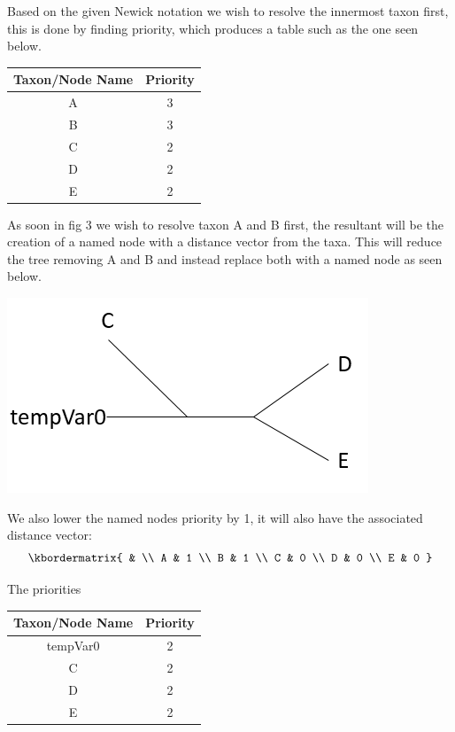 \documentclass{article}
\begin{document}
Based on the given Newick notation we wish to resolve the innermost taxon first, this is done by finding priority, which produces a table such as the one seen below.

\begin{center}
	\begin{tabular}{ |c|c| } 
		\hline
		Taxon/Node Name & Priority  \\
		\hline
		 A & 3 \\ 
		 \hline
		 B & 3 \\ 
		 \hline
		 C & 2 \\
		 \hline 
		 D & 2 \\
		 \hline 
		 E & 2 \\ 
		\hline
	\end{tabular}
\end{center}

As soon in fig 3 we wish to resolve taxon A and B first, the resultant will be the creation of a named node with a distance vector from the taxa. This will reduce the tree removing A and B and instead replace both with a named node as seen below. \newline

\includegraphics{secondTree.PNG} 

We also lower the named nodes priority by 1, it will also have the associated distance vector:
\[
\kbordermatrix{
	& \\
	A & 1 \\
	B & 1 \\
	C & 0 \\
	D & 0 \\
	E & 0
}
\]

The priorities 
\begin{center}
	\begin{tabular}{ |c|c| } 
		\hline
		Taxon/Node Name & Priority  \\
		\hline
		tempVar0 & 2 \\ 
		\hline
		C & 2 \\
		\hline 
		D & 2 \\
		\hline 
		E & 2 \\ 
		\hline
	\end{tabular}
\end{center}
\end{document}
